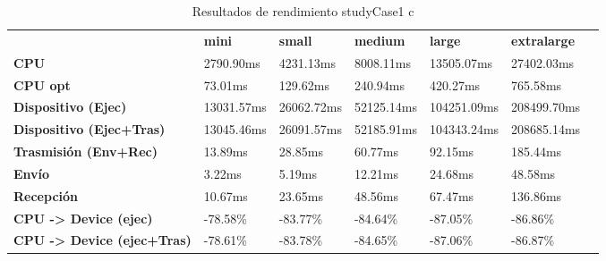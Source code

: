 \begin{table}[H]
    \centering
    \begin{tabular}{lllllll}
    \rowcolor[HTML]{DAE8FC} \ &  \textbf{mini} &  \textbf{small} &  \textbf{medium} &  \textbf{	large} &  \textbf{	extralarge} \\
    \cellcolor[HTML]{DAE8FC} \textbf{CPU} & 2790.90ms & 4231.13ms & 8008.11ms & 	13505.07ms & 	27402.03ms \\
    \rowcolor[HTML]{EFEFEF} \cellcolor[HTML]{DAE8FC} \textbf{CPU opt} & 73.01ms & 129.62ms & 240.94ms & 	420.27ms & 	765.58ms \\
    \cellcolor[HTML]{DAE8FC} \textbf{Dispositivo (Ejec)} & 13031.57ms & 26062.72ms & 52125.14ms & 	104251.09ms & 	208499.70ms \\
    \rowcolor[HTML]{EFEFEF} \cellcolor[HTML]{DAE8FC} \textbf{Dispositivo (Ejec+Tras)} & 13045.46ms & 26091.57ms & 52185.91ms & 	104343.24ms & 	208685.14ms \\
    \cellcolor[HTML]{DAE8FC} \textbf{Trasmisión (Env+Rec)} & 13.89ms & 28.85ms & 60.77ms & 	92.15ms & 	185.44ms \\
    \rowcolor[HTML]{EFEFEF} \cellcolor[HTML]{DAE8FC} \textbf{Envío} & 3.22ms & 5.19ms & 12.21ms & 	24.68ms & 	48.58ms \\
    \cellcolor[HTML]{DAE8FC} \textbf{Recepción} & 10.67ms & 23.65ms & 48.56ms & 	67.47ms & 	136.86ms \\
    \rowcolor[HTML]{EFEFEF} \cellcolor[HTML]{DAE8FC} \textbf{CPU -> Device (ejec)} & -78.58\% & -83.77\% & -84.64\% & 	-87.05\% & 	-86.86\% \\
    \cellcolor[HTML]{DAE8FC} \textbf{CPU -> Device (ejec+Tras)} & -78.61\% & -83.78\% & -84.65\% & 	-87.06\% & 	-86.87\% \\
    \end{tabular}
    \caption[Resultados de rendimiento studyCase1 c]{{Resultados de rendimiento studyCase1 c}}
    \label{table_test_studyCase1_c_hw_performanceResults}
\end{table}